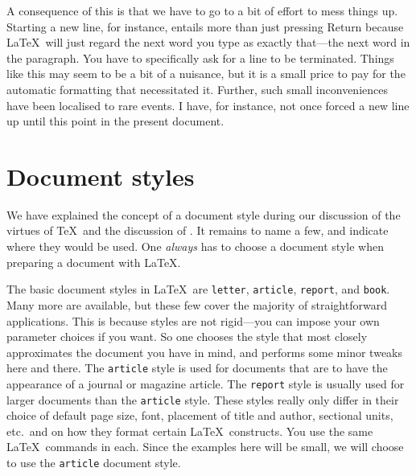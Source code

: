 A consequence of this is that we have to go to a bit of effort to mess things
up.  Starting a new line, for instance, entails more than just pressing
Return because \LaTeX\ will just regard the next word you type
as exactly that---the next word in the paragraph.  You have to specifically
ask for a line to be terminated.  Things like this may seem to be a bit of a
nuisance, but it is a small price to pay for the automatic formatting that
necessitated it.  Further, such small inconveniences have been localised
to rare events.  I have, for instance, not once forced a new line up until
this point in the present document.

\section{Document styles}
We have explained the concept of a document style during our discussion
of the virtues of \TeX\ and the discussion of \AmSTeX.  It remains to
name a few, and indicate where they would be used.  One {\em always\/}
has to choose a document style when preparing a document with \LaTeX.

The basic document styles in \LaTeX\ are {\tt letter}, {\tt article}, {\tt report},
and {\tt book}.  Many more are available, but these few cover the majority
of straightforward applications.  This is because styles are not rigid---you
can impose your own parameter choices if you want.  So one chooses the
style that most closely approximates the document you have in mind, and
performs some minor tweaks here and there.  The {\tt article} style is
used for documents that are to have the appearance of a journal or
magazine article. The {\tt report} style is usually used
for larger documents than the {\tt article} style.  These styles really only
differ in their choice of default page size, font, placement of title and author,
sectional units, etc.\ and on how they format certain \LaTeX\ constructs.
You use the same \LaTeX\ commands in each.  Since the
examples here will be small, we will choose to use the {\tt article} document
style.

